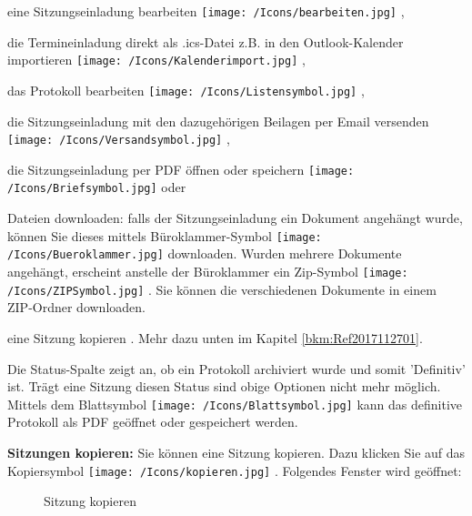 \begin{compactitem}
	\item eine Sitzungseinladung bearbeiten \texttt{[image: /Icons/bearbeiten.jpg]} ,
	\item die Termineinladung direkt als .ics-Datei z.B. in den Outlook-Kalender importieren \texttt{[image: /Icons/Kalenderimport.jpg]} ,
	\item das Protokoll bearbeiten \texttt{[image: /Icons/Listensymbol.jpg]} ,
	\item die Sitzungseinladung mit den dazugehörigen Beilagen per Email versenden \texttt{[image: /Icons/Versandsymbol.jpg]} ,
	\item die Sitzungseinladung per PDF öffnen oder speichern \texttt{[image: /Icons/Briefsymbol.jpg]}  oder
	\item Dateien downloaden: falls der Sitzungseinladung ein Dokument angehängt wurde, können Sie dieses mittels Büroklammer-Symbol \texttt{[image: /Icons/Bueroklammer.jpg]}  downloaden. Wurden mehrere Dokumente angehängt, erscheint anstelle der Büroklammer ein Zip-Symbol \texttt{[image: /Icons/ZIPSymbol.jpg]} . Sie können die verschiedenen Dokumente in einem ZIP-Ordner downloaden.
	\item eine Sitzung kopieren . Mehr dazu unten im Kapitel \ref{bkm:Ref2017112701}.
	\end{compactitem}
	
Die Status-Spalte  zeigt an, ob ein Protokoll archiviert wurde und somit 'Definitiv' ist. Trägt eine Sitzung diesen Status sind obige Optionen nicht mehr möglich. Mittels dem Blattsymbol \texttt{[image: /Icons/Blattsymbol.jpg]} kann das definitive Protokoll als PDF geöffnet oder gespeichert werden.
	
\vspace{\baselineskip}
\label{bkm:Ref2017112701}

\textbf{Sitzungen kopieren:} Sie können eine Sitzung kopieren. Dazu klicken Sie auf das Kopiersymbol \texttt{[image: /Icons/kopieren.jpg]} . Folgendes Fenster wird geöffnet: 

\begin{figure}[H]
\caption{Sitzung kopieren}
\end{figure}

